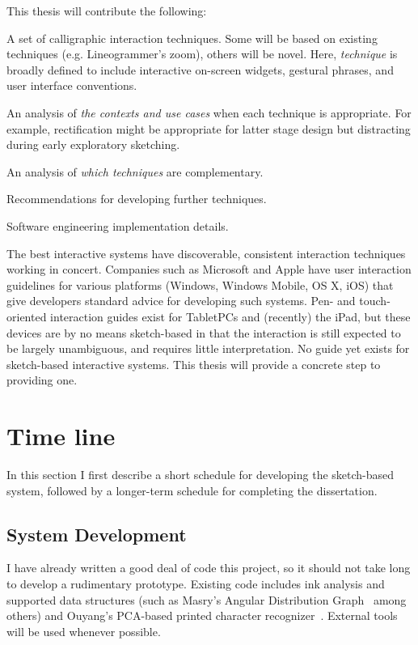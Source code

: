 \documentclass[11pt]{article}
\newenvironment{packed_enum}{
\begin{enumerate}
  \setlength{\itemsep}{1pt}
  \setlength{\parskip}{0pt}
  \setlength{\parsep}{0pt}
}{\end{enumerate}}
\begin{document}
This thesis will contribute the following:
\begin{packed_enum}
\item A set of calligraphic interaction techniques. Some will be based
  on existing techniques (e.g. Lineogrammer's zoom), others will be
  novel. Here, \textit{technique} is broadly defined to include
  interactive on-screen widgets, gestural phrases, and user interface
  conventions.
\item An analysis of \textit{the contexts and use cases} when each
  technique is appropriate. For example, rectification might be
  appropriate for latter stage design but distracting during early
  exploratory sketching.
\item An analysis of \textit{which techniques} are complementary.
\item Recommendations for developing further techniques.
\item Software engineering implementation details.
\end{packed_enum}

The best interactive systems have discoverable, consistent interaction
techniques working in concert. Companies such as Microsoft and Apple
have user interaction guidelines for various platforms (Windows,
Windows Mobile, OS X, iOS) that give developers standard advice for
developing such systems. Pen- and touch-oriented interaction guides
exist for TabletPCs and (recently) the iPad, but these devices are by
no means sketch-based in that the interaction is still expected to be
largely unambiguous, and requires little interpretation. No guide yet
exists for sketch-based interactive systems. This thesis will provide
a concrete step to providing one.

\section{Time line}

In this section I first describe a short schedule for developing the
sketch-based system, followed by a longer-term schedule for completing
the dissertation. 

\subsection{System Development}
\label{sec:system-development-schedule}

I have already written a good deal of code this project, so it should
not take long to develop a rudimentary prototype. Existing code
includes ink analysis and supported data structures (such as Masry's
Angular Distribution Graph~\cite{masry-3d-sketch} among others) and
Ouyang's PCA-based printed character
recognizer~\cite{ouyang-visual-recog}. External tools will be used
whenever possible.
\end{document}
